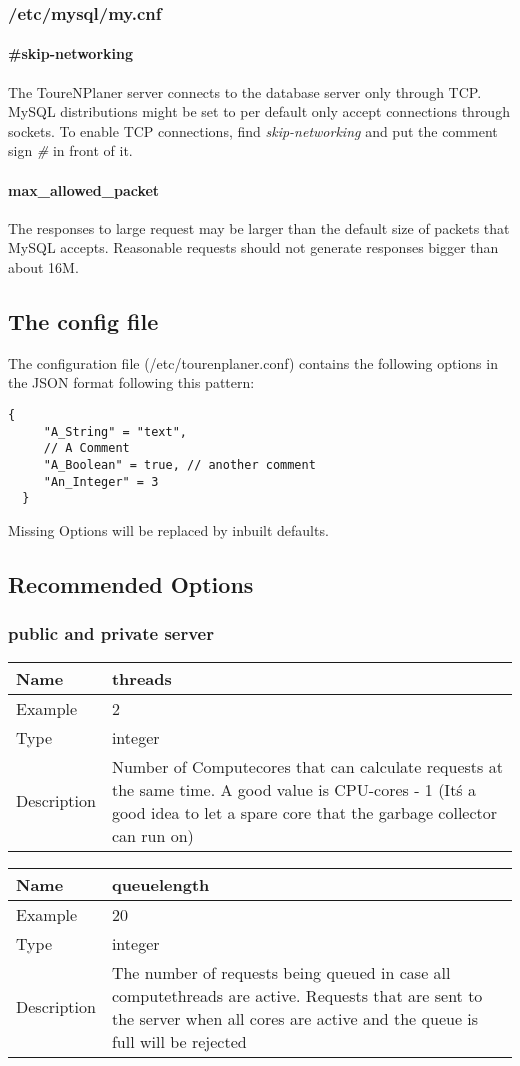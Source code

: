 \documentclass[ngerman,titlepage,parskip=true]{scrartcl}
\newcommand{\configoption}[4]
{%
\setlength{\extrarowheight}{2pt}
\begin{tabular}{|p{0.2\textwidth}|p{0.9\textwidth}|}
\hline
  \textbf{Name} & \textbf{#1}\\\hline
  Example & #2\\\hline
  Type & #3\\\hline
  Description & #4\\\hline
\end{tabular}
}
\begin{document}
\subsubsection{/etc/mysql/my.cnf}
	 \paragraph{\#skip-networking}
	 The ToureNPlaner server connects to the database server only through TCP. MySQL distributions might be set to per default only accept connections through sockets.
	 To enable TCP connections, find \textit{skip-networking} and put the comment sign \textit{\#} in front of it.
	 \paragraph{max\_allowed\_packet}
	 The responses to large request may be larger than the default size of packets that MySQL accepts. Reasonable requests should not generate responses bigger than about 16M.

\subsection{The config file}
The configuration file (/etc/tourenplaner.conf) contains the following options in the JSON format following this pattern:
\begin{lstlisting}[caption=Sample configuration]
  {
	 "A_String" = "text",
	 // A Comment
	 "A_Boolean" = true, // another comment
	 "An_Integer" = 3
  }
\end{lstlisting}

Missing Options will be replaced by inbuilt defaults.


\subsection{Recommended Options}

\subsubsection{public and private server}

\configoption
{threads}
{2}
{integer}
{Number of Computecores that can calculate requests at the same time. A good value is CPU-cores - 1 (It\'s a good idea to let a spare core that the garbage collector can run on)}

\configoption
{queuelength}
{20}
{integer}
{The number of requests being queued in case all computethreads are active. Requests that are sent to the server when all cores are active and the queue is full will be rejected}
\end{document}
